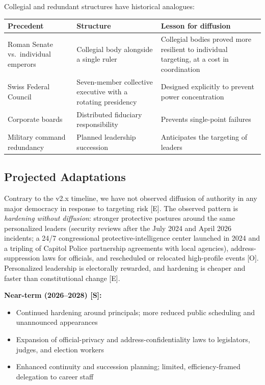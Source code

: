 \documentclass[11pt,letterpaper]{article}
\begin{document}
Collegial and redundant structures have historical analogues:

\begin{center}
\small
\begin{tabular}{L{4.0cm}L{4.6cm}L{5.6cm}}
\toprule
\textbf{Precedent} & \textbf{Structure} & \textbf{Lesson for diffusion} \\
\midrule
Roman Senate vs.\ individual emperors & Collegial body alongside a single ruler & Collegial bodies proved more resilient to individual targeting, at a cost in coordination \\
Swiss Federal Council & Seven-member collective executive with a rotating presidency & Designed explicitly to prevent power concentration \\
Corporate boards & Distributed fiduciary responsibility & Prevents single-point failures \\
Military command redundancy & Planned leadership succession & Anticipates the targeting of leaders \\
\bottomrule
\end{tabular}
\end{center}

\subsection{Projected Adaptations}

\begin{keybox}
Contrary to the v2.x timeline, we have not observed diffusion of authority in any major democracy in response to targeting risk [E]. The observed pattern is \textit{hardening without diffusion}: stronger protective postures around the same personalized leaders (security reviews after the July 2024 and April 2026 incidents; a 24/7 congressional protective-intelligence center launched in 2024 and a tripling of Capitol Police partnership agreements with local agencies), address-suppression laws for officials, and rescheduled or relocated high-profile events [O]. Personalized leadership is electorally rewarded, and hardening is cheaper and faster than constitutional change [E].
\end{keybox}

\textbf{Near-term (2026--2028) [S]:}
\begin{itemize}
  \item Continued hardening around principals; more reduced public scheduling and unannounced appearances
  \item Expansion of official-privacy and address-confidentiality laws to legislators, judges, and election workers
  \item Enhanced continuity and succession planning; limited, efficiency-framed delegation to career staff
\end{itemize}
\end{document}

